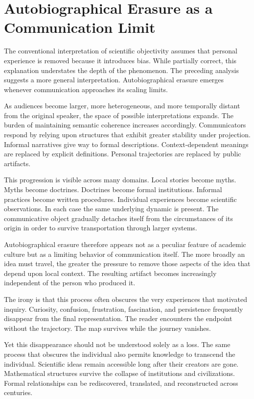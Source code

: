 \documentclass[11pt]{article}
\theoremstyle{plain}
\begin{document}
\section{Autobiographical Erasure as a Communication Limit}

The conventional interpretation of scientific objectivity assumes that personal experience is removed because it introduces bias. While partially correct, this explanation understates the depth of the phenomenon. The preceding analysis suggests a more general interpretation. Autobiographical erasure emerges whenever communication approaches its scaling limits.

As audiences become larger, more heterogeneous, and more temporally distant from the original speaker, the space of possible interpretations expands. The burden of maintaining semantic coherence increases accordingly. Communicators respond by relying upon structures that exhibit greater stability under projection. Informal narratives give way to formal descriptions. Context-dependent meanings are replaced by explicit definitions. Personal trajectories are replaced by public artifacts.

This progression is visible across many domains. Local stories become myths. Myths become doctrines. Doctrines become formal institutions. Informal practices become written procedures. Individual experiences become scientific observations. In each case the same underlying dynamic is present. The communicative object gradually detaches itself from the circumstances of its origin in order to survive transportation through larger systems.

Autobiographical erasure therefore appears not as a peculiar feature of academic culture but as a limiting behavior of communication itself. The more broadly an idea must travel, the greater the pressure to remove those aspects of the idea that depend upon local context. The resulting artifact becomes increasingly independent of the person who produced it.

The irony is that this process often obscures the very experiences that motivated inquiry. Curiosity, confusion, frustration, fascination, and persistence frequently disappear from the final representation. The reader encounters the endpoint without the trajectory. The map survives while the journey vanishes.

Yet this disappearance should not be understood solely as a loss. The same process that obscures the individual also permits knowledge to transcend the individual. Scientific ideas remain accessible long after their creators are gone. Mathematical structures survive the collapse of institutions and civilizations. Formal relationships can be rediscovered, translated, and reconstructed across centuries.
\end{document}
